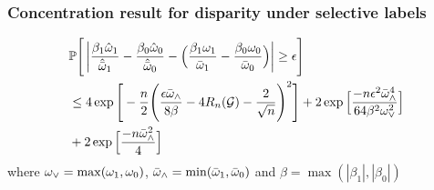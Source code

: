 \documentclass{article}
\begin{document}
\subsubsection{Concentration result for disparity under selective labels}
\begin{lemma}%
\label{lemma:disparity concentration selective labels}
\begin{align*}
& \mathbb{P}\Bigg[  \left| \frac{\beta_1 \hat{\omega}_1 }{\hat{\bar{\omega}}_1} - \frac{\beta_0 \hat{\omega}_0}{\hat{\bar{\omega}}_0} -  \Big(\frac{\beta_1 \omega_1}{\bar{\omega}_1} - \frac{\beta_0 \omega_0}{\bar{\omega}_0} \Big) \right| \geq \epsilon \Bigg] \\
 &\leq 4\exp\Bigg[-\frac{n}{2}\Bigg(\frac{\epsilon \bar{\omega}_{\wedge}}{8\beta}  - 4 R_n(\mathcal{G}) - \frac{2}{\sqrt{n}}\Bigg)^2 \Bigg] + 2\exp \Big[\frac{-n \epsilon^2 \bar{\omega}_{\wedge}^4}{64\beta^2\omega_{\vee}^2} \Big] \\
 &+2\exp\Big[\frac{-n\bar{\omega}_{\wedge}^2}{4} \Big]
\end{align*} 
where $\omega_{\vee} = \max(\omega_1, \omega_0)$, $\bar{\omega}_{\wedge} = \min(\bar{\omega}_1, \bar{\omega}_0)$ and ${\beta = \max(\left| \beta_1 \right|, \left |\beta_0 \right|)}$
\end{lemma}
\end{document}
